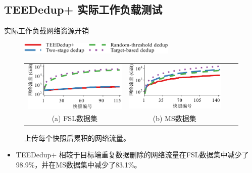 \documentclass{beamer}
\newcommand{\prototype}{TEEDedup+ }
\begin{document}
\subsection{\prototype 实际工作负载测试}

\begin{frame}{实际工作负载网络资源开销}
    \begin{figure}[!htb]
        \centering
        \includegraphics[height=16pt]{../pic/featurespy/plot/bandwidth/upload_traffic_legend.pdf}
        \vspace{5pt} \\
        \begin{tabular}{@{\ }c@{\ }c@{\ }c@{\ }c}
            \includegraphics[width=0.45\linewidth]{../pic/featurespy/plot/bandwidth/upload_traffic_fsl.pdf} &
            \includegraphics[width=0.45\linewidth]{../pic/featurespy/plot/bandwidth/upload_traffic_ms.pdf}                          \\
            {\small (a) FSL数据集}                                                                          & {\small (b) MS数据集}
        \end{tabular}
        \caption{上传每个快照后累积的网络流量。}
        \label{fig:featurespy-expNetworkTraffic}
    \end{figure}

    \begin{itemize}
        \item \prototype 相较于目标端重复数据删除的网络流量在FSL数据集中减少了98.9\%，并在MS数据集中减少了83.1\%。
    \end{itemize}
\end{frame}
\end{document}
